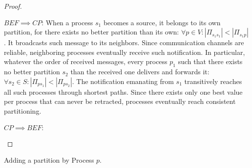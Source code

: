 \begin{proof}
  \begin{asparadesc}
  \item [$BEF \implies CP$:] When a process $s_1$ becomes a source, it
    belongs to its own partition, for there exists no better partition
    than its own: $\forall p \in V: |\Pi_{s_1 s_1}| < |\Pi_{s_1
      p}|$. It broadcasts such message to its neighbors. Since
    communication channels are reliable, neighboring processes
    eventually receive such notification. In particular, whatever the
    order of received messages, every process $p_1$ such that there
    exists no better partition $s_2$ than the received one delivers
    and forwards it: $\forall s_2 \in S: |\Pi_{p s_1}| < |\Pi_{p
      s_2}|$. The notification emanating from $s_1$ transitively
    reaches all such processes through shortest paths. Since there
    exists only one best value per process that can never be
    retracted, processes eventually reach consistent
    partitioning. 
  \item [$CP \implies BEF$:] 
  \end{asparadesc}
\end{proof}

\begin{algorithm}
  
  \caption{\label{algo:add}Adding a partition by Process $p$.}
\end{algorithm}

 

